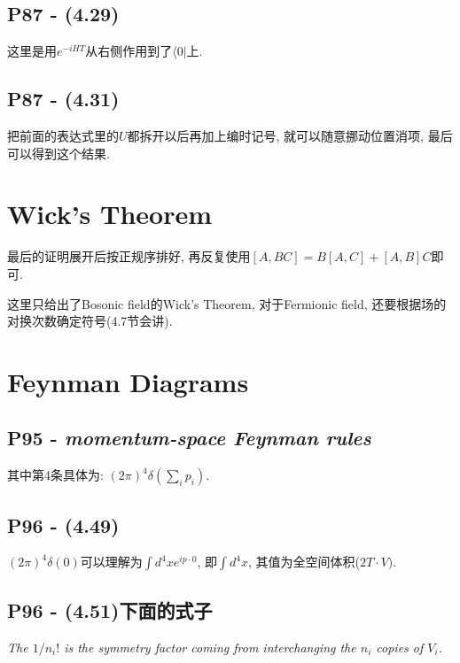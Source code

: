 \documentclass[10pt,b5paper,openany]{book}
\begin{document}
\subsection{P87 - (4.29)}

这里是用$e^{-iHT}$从右侧作用到了$\langle 0|$上. 

\subsection{P87 - (4.31)}

把前面的表达式里的$U$都拆开以后再加上编时记号, 就可以随意挪动位置消项, 最后可以得到这个结果. 

\section{Wick's Theorem}

最后的证明展开后按正规序排好, 再反复使用$[A, BC] = B[A, C] + [A, B]C$即可. 

这里只给出了Bosonic field的Wick's Theorem, 对于Fermionic field, 还要根据场的对换次数确定符号(4.7节会讲). 

\section{Feynman Diagrams}

\subsection{P95 - \textit{momentum-space Feynman rules}}

其中第4条具体为: $(2\pi)^4 \delta(\sum\limits_i p_i)$. 

\subsection{P96 - (4.49)}

$(2\pi)^4 \delta(0)$可以理解为$\int d^4x e^{ip\cdot 0}$, 即$\int d^4x$, 其值为全空间体积($2T\cdot V)$. 

\subsection{P96 - (4.51)下面的式子}

\textit{The $1/n_i !$ is the symmetry factor coming from interchanging the $n_i$ copies of $V_i$.}
  
\end{document}
